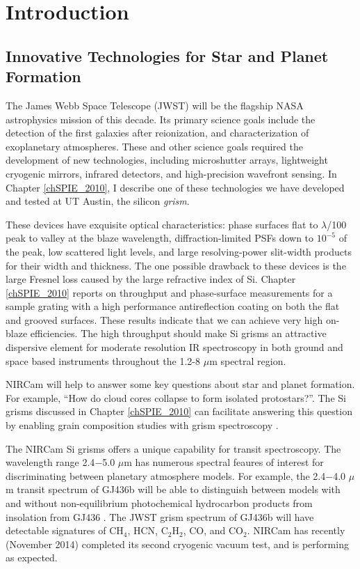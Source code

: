 \chapter{Introduction}

\section{Innovative Technologies for Star and Planet Formation}

The James Webb Space Telescope (JWST) will be the flagship NASA astrophysics mission of this decade.  Its primary science goals include the detection of the first galaxies after reionization, and characterization of exoplanetary atmospheres.  These and other science goals required the development of new technologies, including microshutter arrays, lightweight cryogenic mirrors, infrared detectors, and high-precision wavefront sensing.  In Chapter \ref{chSPIE_2010}, I describe one of these technologies we have developed and tested at UT Austin, the silicon \emph{grism}.

These devices have exquisite optical characteristics: phase surfaces flat to $\lambda$/100 peak to valley at the blaze wavelength, diffraction-limited PSFs down to $10^{-5}$ of the peak, low scattered light levels, and large resolving-power slit-width products for their width and thickness.  The one possible drawback to these devices is the large Fresnel loss caused by the large refractive index of Si.  Chapter \ref{chSPIE_2010} reports on throughput and phase-surface measurements for a sample grating with a high performance antireflection coating on both the flat and grooved surfaces. These results indicate that we can achieve very high on-blaze efficiencies.  The high throughput should make Si grisms an attractive dispersive element for moderate resolution IR spectroscopy in both ground and space based instruments throughout the 1.2-8 $\mu$m spectral region.

NIRCam will help to answer some key questions about star and planet formation.  For example, ``How do cloud cores collapse to form isolated protostars?''.  The Si grisms discussed in Chapter \ref{chSPIE_2010} can facilitate answering this question by enabling grain composition studies with grism spectroscopy \citep{2012SPIE.8442E..2NB}.

The NIRCam Si grisms offers a unique capability for transit spectroscopy.  The wavelength range 2.4$-$5.0 $\mu$m has numerous spectral feaures of interest for discriminating between planetary atmosphere models.  For example, the 2.4$-$4.0 $\mu$m transit spectrum of GJ436b will be able to distinguish between models with and without non-equilibrium photochemical hydrocarbon products from insolation from GJ436 \citep{2011ApJ...727...65S}.  The JWST grism spectrum of GJ436b will have detectable signatures of CH$_4$, HCN, C$_2$H$_2$, CO, and CO$_2$.  NIRCam has recently (November 2014) completed its second cryogenic vacuum test, and is performing as expected.

